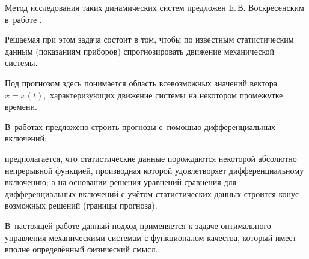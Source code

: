 %









Метод исследования таких динамических систем  предложен Е.\,В. Воскресенским в~работе \cite{kaledin_sukharev:EVV}.

Решаемая при этом задача состоит в том, чтобы по известным статистическим данным (показаниям приборов) спрогнозировать движение механической системы.

Под прогнозом здесь понимается область всевозможных значений вектора $ x=x(t),$ характеризующих движение системы на некотором промежутке времени.

В~работах \cite{kaledin_sukharev:EVV, kaledin_sukharev:EVV2} предложено строить прогнозы с~помощью дифференциальных включений:

предполагается, что статистические данные порождаются некоторой абсолютно непрерывной функцией, производная которой удовлетворяет дифференциальному включению; а на основании решения уравнений сравнения для дифференциальных включений с учётом статистических данных строится конус возможных решений (границы прогноза).

В~настоящей работе данный подход применяется к задаче оптимального управления механическими системам с функционалом качества, который имеет вполне определённый физический смысл.






